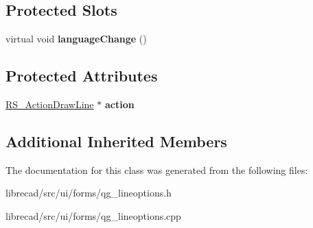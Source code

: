 \subsection*{Protected Slots}
\begin{DoxyCompactItemize}
\item 
\hypertarget{classQG__LineOptions_a87af90cdd7e45f49997fa7b2cd0b2615}{virtual void {\bfseries language\-Change} ()}\label{classQG__LineOptions_a87af90cdd7e45f49997fa7b2cd0b2615}

\end{DoxyCompactItemize}
\subsection*{Protected Attributes}
\begin{DoxyCompactItemize}
\item 
\hypertarget{classQG__LineOptions_aeab031ab3ee8a8312ae5c0afb0823e4d}{\hyperlink{classRS__ActionDrawLine}{R\-S\-\_\-\-Action\-Draw\-Line} $\ast$ {\bfseries action}}\label{classQG__LineOptions_aeab031ab3ee8a8312ae5c0afb0823e4d}

\end{DoxyCompactItemize}
\subsection*{Additional Inherited Members}


The documentation for this class was generated from the following files\-:\begin{DoxyCompactItemize}
\item 
librecad/src/ui/forms/qg\-\_\-lineoptions.\-h\item 
librecad/src/ui/forms/qg\-\_\-lineoptions.\-cpp\end{DoxyCompactItemize}
